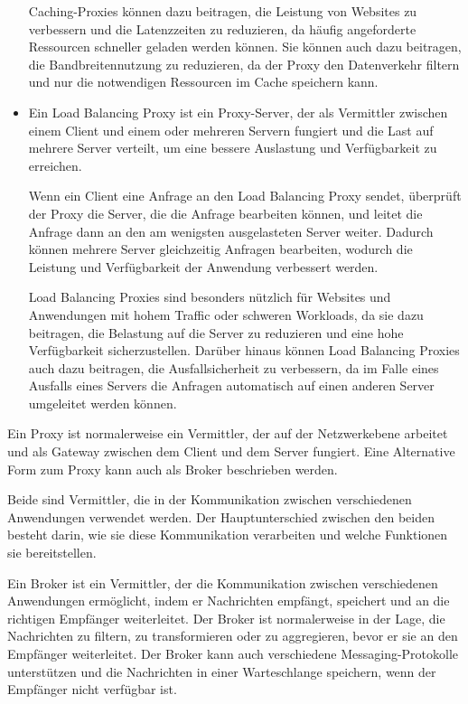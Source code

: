 \begin{itemize}
Caching-Proxies können dazu beitragen, die Leistung von Websites zu verbessern und die Latenzzeiten zu reduzieren, da häufig angeforderte Ressourcen schneller geladen werden können. Sie können auch dazu beitragen, die Bandbreitennutzung zu reduzieren, da der Proxy den Datenverkehr filtern und nur die notwendigen Ressourcen im Cache speichern kann.
\item Ein Load Balancing Proxy ist ein Proxy-Server, der als Vermittler zwischen einem Client und einem oder mehreren Servern fungiert und die Last auf mehrere Server verteilt, um eine bessere Auslastung und Verfügbarkeit zu erreichen.

Wenn ein Client eine Anfrage an den Load Balancing Proxy sendet, überprüft der Proxy die Server, die die Anfrage bearbeiten können, und leitet die Anfrage dann an den am wenigsten ausgelasteten Server weiter. Dadurch können mehrere Server gleichzeitig Anfragen bearbeiten, wodurch die Leistung und Verfügbarkeit der Anwendung verbessert werden.

Load Balancing Proxies sind besonders nützlich für Websites und Anwendungen mit hohem Traffic oder schweren Workloads, da sie dazu beitragen, die Belastung auf die Server zu reduzieren und eine hohe Verfügbarkeit sicherzustellen. Darüber hinaus können Load Balancing Proxies auch dazu beitragen, die Ausfallsicherheit zu verbessern, da im Falle eines Ausfalls eines Servers die Anfragen automatisch auf einen anderen Server umgeleitet werden können.
\end{itemize}
Ein Proxy ist normalerweise ein Vermittler, der  auf der Netzwerkebene arbeitet und als Gateway zwischen dem Client und dem Server fungiert. Eine Alternative Form zum Proxy kann auch als Broker beschrieben werden. 

Beide sind Vermittler, die in der Kommunikation zwischen verschiedenen Anwendungen verwendet werden. Der Hauptunterschied zwischen den beiden besteht darin, wie sie diese Kommunikation verarbeiten und welche Funktionen sie bereitstellen.

Ein Broker ist ein Vermittler, der die Kommunikation zwischen verschiedenen Anwendungen ermöglicht, indem er Nachrichten empfängt, speichert und an die richtigen Empfänger weiterleitet. Der Broker ist normalerweise in der Lage, die Nachrichten zu filtern, zu transformieren oder zu aggregieren, bevor er sie an den Empfänger weiterleitet. Der Broker kann auch verschiedene Messaging-Protokolle unterstützen und die Nachrichten in einer Warteschlange speichern, wenn der Empfänger nicht verfügbar ist. 

